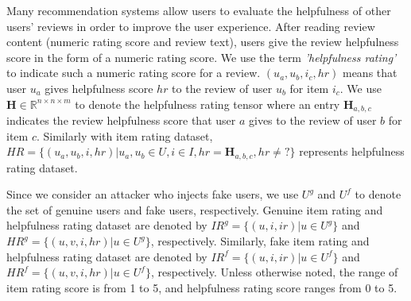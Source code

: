 \documentclass[master,english,final]{kaist-ucs}
\begin{document}
Many recommendation systems allow users to evaluate the helpfulness of other users’ reviews in order to improve the user experience.
After reading review content (numeric rating score and review text), users give the review helpfulness score in the form of a numeric rating score.
We use the term \textit{'helpfulness rating'} to indicate such a numeric rating score for a review.
$(u_a,u_b,i_c,hr)$ means that user $u_a$ gives helpfulness score $hr$ to the review of user $u_b$ for item $i_c$.
We use $\bm{H} \in \mathbb{R}^{n \times n \times m}$ to denote the helpfulness rating tensor where an entry $\bm{H}_{a,b,c}$ indicates the review helpfulness score that user $a$ gives to the review of user $b$ for item $c$.
Similarly with item rating dataset, $HR=\{(u_a,u_b,i,hr)| u_a,u_b \in U,i \in I,hr=\bm{H}_{a,b,c},hr \neq ?\}$ represents helpfulness rating dataset.

Since we consider an attacker who injects fake users, we use $U^g$ and $U^f$ to denote the set of genuine users and fake users, respectively.
Genuine item rating and helpfulness rating dataset are denoted by $IR^g=\{(u,i,ir)|u \in U^g\}$ and $HR^g=\{(u,v,i,hr)|u \in U^g\}$, respectively.
Similarly, fake item rating and helpfulness rating dataset are denoted by $IR^f=\{(u,i,ir)|u \in U^f\}$ and $HR^f=\{(u,v,i,hr)|u \in U^f\}$, respectively.
Unless otherwise noted, the range of item rating score is from 1 to 5, and helpfulness rating score ranges from 0 to 5.
\end{document}
